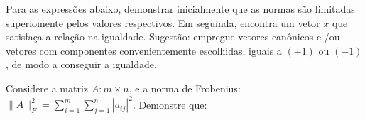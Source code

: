 \documentclass[a4paper,12pt, leqno, answers]{exam}
\begin{document}
\begin{questions}
    
    \question Para as express\~{o}es abaixo, demonstrar inicialmente que as normas s\~{a}o limitadas superiomente pelos valores respectivos. Em seguinda, encontra um vetor $x$ que satisfa\c{c}a a rela\c{c}\~{a}o na igualdade. Sugest\~{a}o: empregue vetores canônicos e /ou vetores com componentes convenientemente escolhidas, iguais a $\left( +1 \right)$ ou $\left( -1 \right)$, de modo a conseguir a igualdade.

    \question Considere a matriz $A : m \times n$, e a norma de Frobenius: $\| A \|_F^2 = \sum_{i = 1}^m \sum_{j = 1}^n | a_{ij} |^2$. Demonstre que:
\end{questions}
\end{document}
